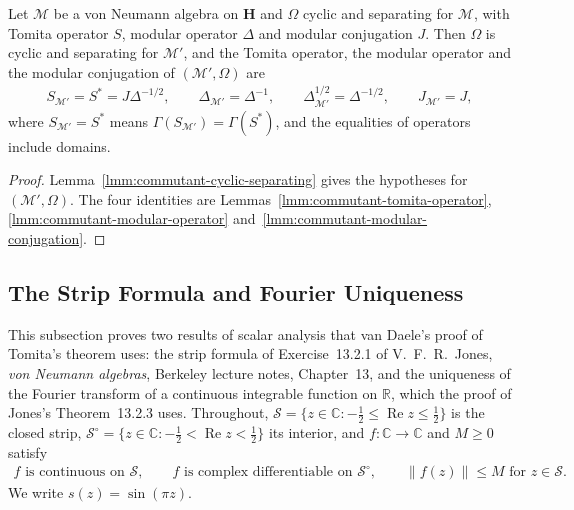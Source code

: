 \begin{theorem}
    \label{thrm:commutant-modular-objects}
    \leanok
    Let $\mathcal{M}$ be a von Neumann algebra on $\mathbf{H}$ and $\Omega$ cyclic and separating for $\mathcal{M}$, with Tomita operator $S$, modular operator $\Delta$ and modular conjugation $J$. Then $\Omega$ is cyclic and separating for $\mathcal{M}'$, and the Tomita operator, the modular operator and the modular conjugation of $(\mathcal{M}', \Omega)$ are
    \begin{align}
        S_{\mathcal{M}'} = S^* = J\Delta^{-1/2}, \qquad \Delta_{\mathcal{M}'} = \Delta^{-1}, \qquad \Delta_{\mathcal{M}'}^{1/2} = \Delta^{-1/2}, \qquad J_{\mathcal{M}'} = J,
    \end{align}
    where $S_{\mathcal{M}'} = S^*$ means $\Gamma(S_{\mathcal{M}'}) = \Gamma(S^*)$, and the equalities of operators include domains.
\end{theorem}
\begin{proof}
    \leanok
    Lemma~\ref{lmm:commutant-cyclic-separating} gives the hypotheses for $(\mathcal{M}', \Omega)$. The four identities are Lemmas~\ref{lmm:commutant-tomita-operator}, \ref{lmm:commutant-modular-operator} and~\ref{lmm:commutant-modular-conjugation}.
\end{proof}

\subsection{The Strip Formula and Fourier Uniqueness}\label{sbsctn:strip-formula}

This subsection proves two results of scalar analysis that van Daele's proof of Tomita's theorem uses: the strip formula of Exercise~13.2.1 of V.~F.~R.~Jones, \emph{von Neumann algebras}, Berkeley lecture notes, Chapter~13, and the uniqueness of the Fourier transform of a continuous integrable function on $\mathbb{R}$, which the proof of Jones's Theorem~13.2.3 uses. Throughout, $\mathcal{S} = \{z \in \mathbb{C} : -\tfrac{1}{2} \le \operatorname{Re} z \le \tfrac{1}{2}\}$ is the closed strip, $\mathcal{S}^\circ = \{z \in \mathbb{C} : -\tfrac{1}{2} < \operatorname{Re} z < \tfrac{1}{2}\}$ its interior, and $f : \mathbb{C} \to \mathbb{C}$ and $M \ge 0$ satisfy
\begin{align}
    f \text{ is continuous on } \mathcal{S}, \qquad f \text{ is complex differentiable on } \mathcal{S}^\circ, \qquad \|f(z)\| \le M \text{ for } z \in \mathcal{S}. \label{eq:strip-hypotheses}
\end{align}
We write $s(z) = \sin(\pi z)$.

